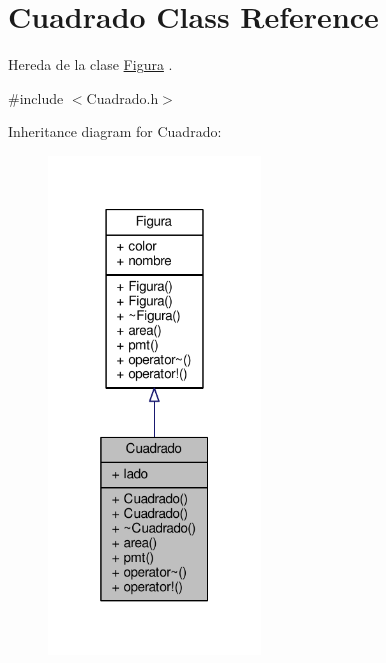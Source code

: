 \hypertarget{class_cuadrado}{\section{Cuadrado Class Reference}
\label{class_cuadrado}
}


Hereda de la clase \hyperlink{class_figura}{Figura} .  




{\ttfamily \#include $<$Cuadrado.\+h$>$}



Inheritance diagram for Cuadrado\+:\nopagebreak
\begin{figure}[H]
\begin{center}
\leavevmode
\includegraphics[width=160pt]{class_cuadrado__inherit__graph}
\end{center}
\end{figure}
